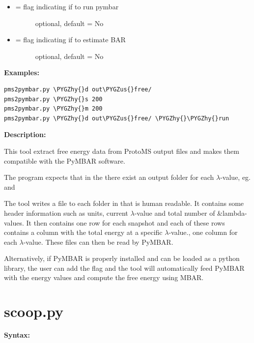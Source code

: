 \documentclass[letterpaper,10pt,english]{sphinxmanual}
\def\PYGZus{\char`\_}
\def\PYGZhy{\char`\-}
\begin{document}
\begin{itemize}
\begin{description}
\end{description}

\item {} \begin{description}
\item[{ = flag indicating if to run pymbar}] \leavevmode
optional, default = No

\end{description}

\item {} \begin{description}
\item[{ = flag indicating if to estimate BAR}] \leavevmode
optional, default = No

\end{description}

\end{itemize}

\textbf{Examples:}

\begin{Verbatim}[commandchars=\\\{\}]
pms2pymbar.py \PYGZhy{}d out\PYGZus{}free/
pms2pymbar.py \PYGZhy{}s 200
pms2pymbar.py \PYGZhy{}m 200
pms2pymbar.py \PYGZhy{}d out\PYGZus{}free/ \PYGZhy{}\PYGZhy{}run
\end{Verbatim}

\textbf{Description:}

This tool extract free energy data from ProtoMS output files and makes them compatible with the PyMBAR software.

The program expects that in the  there exist an output folder for each \(\lambda\)-value, eg.  and 

The tool writes a file  to each folder in  that is human readable. It contains some header information such as units, current \(\lambda\)-value and total number of \&lambda-values. It then contains one row for each snapshot and each of these rows contains a column with the total energy at a specific \(\lambda\)-value., one column for each \(\lambda\)-value. These files can then be read by PyMBAR.

Alternatively, if PyMBAR is properly installed and can be loaded as a python library, the user can add the  flag and the tool will automatically feed PyMBAR with the energy values and compute the free energy using MBAR.


\section{scoop.py}
\label{tools:scoop-py}
\textbf{Syntax:}
\end{document}
